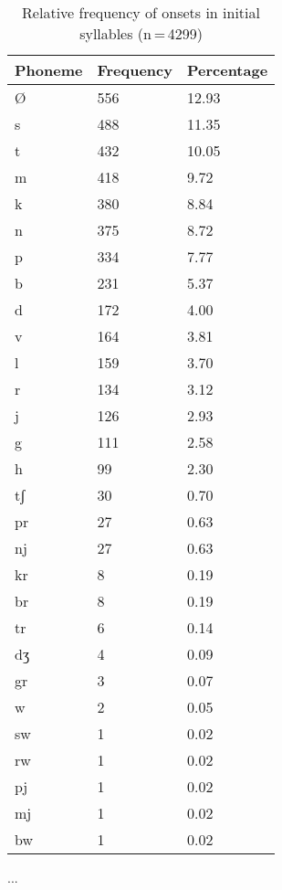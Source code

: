 \begin{table}[hp]\centering
\caption[Relative frequency of onsets in initial syllables]{Relative frequency of onsets in initial syllables (n\,=\,4299)}
\begin{tabu} to 0.5\textwidth{X X[c] X[c]}
\tableheaderfont\toprule
Phoneme
	& Frequency
	& Percentage
	\\
	
\toprule

Ø	&	556	&	12.93\pct\\

\midrule

s	&	488	&	11.35\pct\\
t	&	432	&	10.05\pct\\
m	&	418	&	9.72\pct\\
k	&	380	&	8.84\pct\\
n	&	375	&	8.72\pct\\
p	&	334	&	7.77\pct\\
b	&	231	&	5.37\pct\\
d	&	172	&	4.00\pct\\
v	&	164	&	3.81\pct\\
l	&	159	&	3.70\pct\\
r	&	134	&	3.12\pct\\
j	&	126	&	2.93\pct\\
g	&	111	&	2.58\pct\\
h	&	99	&	2.30\pct\\
tʃ	&	30	&	0.70\pct\\
pr	&	27	&	0.63\pct\\
nj	&	27	&	0.63\pct\\
kr	&	8	&	0.19\pct\\
br	&	8	&	0.19\pct\\
tr	&	6	&	0.14\pct\\
dʒ	&	4	&	0.09\pct\\
gr	&	3	&	0.07\pct\\
w	&	2	&	0.05\pct\\
sw	&	1	&	0.02\pct\\
rw	&	1	&	0.02\pct\\
pj	&	1	&	0.02\pct\\
mj	&	1	&	0.02\pct\\
bw	&	1	&	0.02\pct\\

\bottomrule
\end{tabu}
\label{tab:initon}
\end{table}

...

